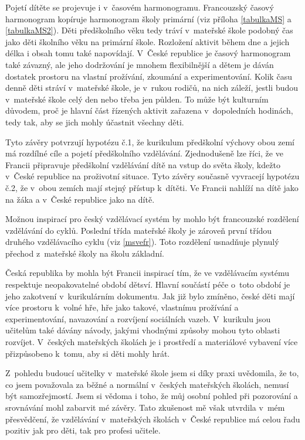 Pojetí dítěte se projevuje i v~časovém harmonogramu. Francouzský časový harmonogram kopíruje harmonogram školy primární (viz příloha \ref{tabulkaMS} a \ref{tabulkaMS2}). Děti předškolního věku tedy tráví v~mateřské škole podobný čas jako děti školního věku na primární škole. Rozložení aktivit během dne a jejich délka i obsah tomu také napovídají. V~České republice je časový harmonogram také závazný, ale jeho dodržování je mnohem flexibilnější a dětem je dáván dostatek prostoru na vlastní prožívání, zkoumání a experimentování. Kolik času denně  děti stráví v~mateřské škole, je v~rukou rodičů, na nich záleží, jestli budou v~mateřské škole celý den nebo třeba jen půlden. To může být kulturním důvodem, proč je hlavní část řízených aktivit zařazena v~dopoledních hodinách, tedy tak, aby se jich mohly účastnit všechny děti. 

Tyto závěry potvrzují hypotézu č.1, že kurikulum předškolní výchovy obou zemí má rozdílné cíle a pojetí předškolního vzdělávání. Zjednodušeně lze říci, že ve Francii připravuje předškolní vzdělávání dítě na vstup do světa školy, kdežto v~České republice na proživotní situace. Tyto závěry současně vyvracejí hypotézu č.2, že v~obou zemích mají stejný přístup k~dítěti. Ve Francii nahlíží na dítě jako na žáka a v~České republice jako na dítě. 

Možnou inspirací pro český vzdělávací systém by mohlo být francouzské rozdělení vzdělávání do cyklů. Poslední třída mateřské školy je zároveň první třídou druhého vzdělávacího cyklu (viz \ref{msvefr}). Toto rozdělení usnadňuje plynulý přechod z~mateřské školy na školu základní. 

Česká republika by mohla být Francii inspirací tím, že ve vzdělávacím systému respektuje neopakovatelné období dětsví. Hlavní součástí péče o~toto období je jeho zakotvení v~kurikulárním dokumentu. Jak již bylo zmíněno, české děti mají více prostoru k~volné hře, hře jako takové, vlastnímu prožívání a experimentování, navazování a rozvíjení sociálních vazeb. V~kurikulu jsou učitelům také dávány návody, jakými vhodnými způsoby mohou tyto oblasti rozvíjet. V~českých mateřských školách je i prostředí a materiálové vybavení více přizpůsobeno k~tomu, aby si děti mohly hrát.

Z~pohledu budoucí učitelky v~mateřské škole jsem si díky praxi uvědomila, že to, co jsem považovala za běžné a normální v~českých mateřských školách, nemusí být samozřejmostí. Jsem si vědoma i toho, že můj osobní pohled při pozorování a srovnávání mohl zabarvit mé závěry. Tato zkušenost mě však utvrdila v~mém přesvědčení, že vzdělávání v~mateřských školách v~České republice má celou řadu pozitiv jak pro děti, tak pro profesi učitele. 